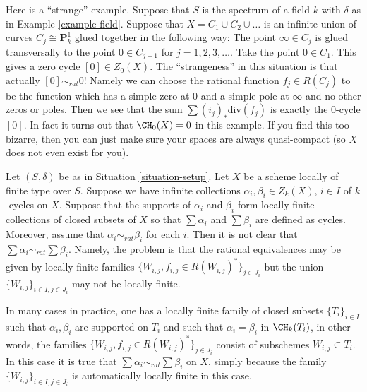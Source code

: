\begin{example}
\label{example-weird}
Here is a ``strange'' example.
Suppose that $S$ is the spectrum of a field $k$
with $\delta$ as in Example \ref{example-field}.
Suppose that $X = C_1 \cup C_2 \cup \ldots$ is an infinite
union of curves $C_j \cong \mathbf{P}^1_k$ glued together
in the following way: The point $\infty \in C_j$ is glued
transversally to the point $0 \in C_{j + 1}$ for $j = 1, 2, 3, \ldots$.
Take the point $0 \in C_1$. This gives a zero cycle
$[0] \in Z_0(X)$. The ``strangeness'' in this situation is
that actually $[0] \sim_{rat} 0$! Namely we can choose
the rational function $f_j \in R(C_j)$ to be the function
which has a simple zero at $0$ and a simple pole at $\infty$
and no other zeros or poles. Then we see that the sum
$\sum (i_j)_*\text{div}(f_j)$ is exactly the $0$-cycle
$[0]$. In fact it turns out that $\CH_0(X) = 0$ in this example.
If you find this too bizarre, then you can just
make sure your spaces are always quasi-compact
(so $X$ does not even exist for you).
\end{example}

\begin{remark}
\label{remark-infinite-sums-rational-equivalences}
Let $(S, \delta)$ be as in Situation \ref{situation-setup}.
Let $X$ be a scheme locally of finite type over $S$.
Suppose we have infinite collections $\alpha_i, \beta_i \in Z_k(X)$,
$i \in I$ of $k$-cycles on $X$. Suppose that the supports
of $\alpha_i$ and $\beta_i$ form locally finite collections
of closed subsets of $X$ so that $\sum \alpha_i$
and $\sum \beta_i$ are defined as cycles. Moreover, assume that
$\alpha_i \sim_{rat} \beta_i$ for each $i$. Then it is not
clear that $\sum \alpha_i \sim_{rat} \sum \beta_i$. Namely,
the problem is that the rational equivalences may be
given by locally finite
families $\{W_{i, j}, f_{i, j} \in R(W_{i, j})^*\}_{j \in J_i}$
but the union $\{W_{i, j}\}_{i \in I, j\in J_i}$ may not
be locally finite.

\medskip\noindent
In many cases in practice, one has a locally finite family of closed
subsets $\{T_i\}_{i \in I}$ such that $\alpha_i, \beta_i$
are supported on $T_i$ and such that $\alpha_i = \beta_i$
in $\CH_k(T_i)$, in other words, the families
$\{W_{i, j}, f_{i, j} \in R(W_{i, j})^*\}_{j \in J_i}$
consist of subschemes $W_{i, j} \subset T_i$. In this case it is true that
$\sum \alpha_i \sim_{rat} \sum \beta_i$ on $X$, simply because
the family $\{W_{i, j}\}_{i \in I, j\in J_i}$ is automatically
locally finite in this case.
\end{remark}






